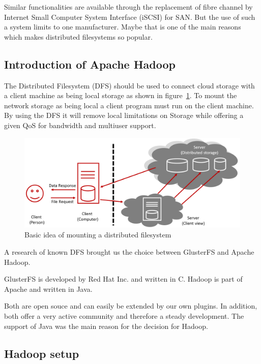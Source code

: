 Similar functionalities are available through the replacement of fibre channel by  Internet Small Computer System Interface (iSCSI) for SAN. But the use of such a system limits to one manufacturer. Maybe that is one of the main reasons which makes distributed filesystems so popular.

\subsection{Introduction of Apache Hadoop}

The Distributed Filesystem (DFS) should be used to connect cloud storage with a client machine as being local storage as shown in figure~\ref{fig:dfs_example}. To mount the network storage as being local a client program must run on the client machine. By using the DFS it will remove local limitations on Storage while offering a given QoS for bandwidth and multiuser support.


\begin{figure}
	\centering
	\includegraphics[width=1\linewidth]{img/dfs_example.png}
	\caption{Basic idea of mounting a distributed filesystem}
	\label{fig:dfs_example}
\end{figure}

A research of known DFS brought us the choice between GlusterFS and Apache Hadoop.

GlusterFS is developed by Red Hat Inc. and written in C. Hadoop is part of Apache and written in Java.

Both are open souce and can easily be extended by our own plugins. In addition, both offer a very active community and therefore a steady development. The support of Java was the main reason for the decision for Hadoop.


\subsection{Hadoop setup}

